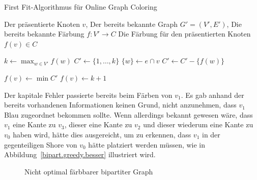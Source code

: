 \documentclass[11pt,abstracton]{scrreprt} %
\theoremstyle{definition}
\begin{document}
\begin{algorithm}
\caption{First Fit-Algorithmus für Online Graph Coloring}
\label{algo.firstfit}
\begin{algorithmic}
\Require
	\State Der präsentierte Knoten $v$,
	\State Der bereits bekannte Graph $G' = (V', E')$,
	\State Die bereits bekannte Färbung $f : V' \rightarrow C$
\Ensure
	\State Die Färbung für den präsentierten Knoten $f(v) \in C$
\Statex

\State $k \gets \max_{w \in V'}f(w)$
\State $C' \gets \{1, \dots, k \}$
\Statex
{}
	\State $\{w\} \gets e \cap v$
		\State $C' \gets C' - \{ f(w) \}$
	\EndIf
	\EndIf
\EndFor
\EndFor

\Statex

	\State $ f(v) \gets \min C'$
\Else
	\State $ f(v) \gets k+1$
\EndIf



\end{algorithmic}
\end{algorithm}

Der kapitale Fehler passierte bereits beim Färben von $v_1$. Es gab anhand der bereits vorhandenen Informationen keinen Grund, nicht anzunehmen, dass $v_1$ Blau zugeordnet bekommen sollte. Wenn allerdings bekannt gewesen wäre, dass $v_1$ eine Kante zu $v_3$, dieser eine Kante zu $v_2$ und dieser wiederum eine Kante zu $v_0$ haben wird, hätte dies ausgereicht, um zu erkennen, dass $v_1$ in der gegenteiligen Shore von $v_0$ hätte platziert werden müssen, wie in Abbildung~\ref{bipart.greedy.besser} illustriert wird.

\begin{figure}
\caption{Nicht optimal färbbarer bipartiter Graph}
\label{bipart.greedy}

\begin{center}


\end{center}

\end{figure}
\end{document}
